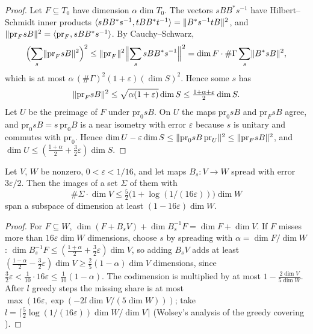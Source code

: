 \begin{proof}
Let $F\subseteq T_0$ have dimension $\alpha\dim T_0$. The vectors $sBB^*s^{-1}$ have Hilbert--Schmidt inner products $\langle sBB^*s^{-1},tBB^*t^{-1}\rangle=\lVert B^*s^{-1}tB\rVert^2$,
and $\lVert \mathrm{pr}_FsB\rVert^2=\langle\mathrm{pr}_F,sBB^*s^{-1}\rangle$. By Cauchy--Schwarz,
\[
  \Bigl(\sum_s\lVert \mathrm{pr}_FsB\rVert^2\Bigr)^2\le\lVert \mathrm{pr}_F\rVert^2\Bigl\|\sum_ssBB^*s^{-1}\Bigr\|^2=\dim F\cdot\#\Gamma\sum_s\lVert B^*sB\rVert^2,
\]
which is at most $\alpha\,(\#\Gamma)^2(1+\varepsilon)(\dim S)^2$. Hence some $s$ has
\[
  \lVert \mathrm{pr}_FsB\rVert^2\le\sqrt{\alpha(1+\varepsilon)}\dim S\le\tfrac{1+\alpha+\varepsilon}2\dim S.
\]
Let $U$ be the preimage of $F$ under $\mathrm{pr}_0sB$. On $U$ the maps
$\mathrm{pr}_0sB$ and $\mathrm{pr}_FsB$ agree, and $\mathrm{pr}_0sB=s\,\mathrm{pr}_0B$ is a near isometry with error $\varepsilon$ because $s$ is unitary and commutes with $\mathrm{pr}_0$. Hence
$\dim U-\varepsilon\dim S\le\lVert \mathrm{pr}_0sB\,\mathrm{pr}_U\rVert^2\le\lVert \mathrm{pr}_FsB\rVert^2$, and $\dim U\le(\frac{1+\alpha}2+\frac32\varepsilon)\dim S$.
\end{proof}

\begin{theorem}\label{thm:few-translates}
Let $V$, $W$ be nonzero, $0<\varepsilon<1/16$, and let maps $B_s\colon V\to W$ spread with error $3\varepsilon/2$. Then the images of a set $\Sigma$ of them with
\[
  \#\Sigma\cdot\dim V\le\tfrac52\bigl(1+\log(1/(16\varepsilon))\bigr)\dim W
\]
span a subspace of dimension at least $(1-16\varepsilon)\dim W$.
\end{theorem}

\begin{proof}
For $F\subseteq W$, $\dim(F+B_sV)+\dim B_s^{-1}F=\dim F+\dim V$. If $F$ misses more than $16\varepsilon\dim W$ dimensions, choose $s$ by spreading with $\alpha=\dim F/\dim W$:
$\dim B_s^{-1}F\le(\frac{1+\alpha}2+\frac32\varepsilon)\dim V$, so adding $B_sV$ adds at least $(\frac{1-\alpha}2-\frac32\varepsilon)\dim V\ge\frac25(1-\alpha)\dim V$ dimensions, since
$\frac32\varepsilon<\frac1{10}\cdot16\varepsilon\le\frac1{10}(1-\alpha)$. The codimension is multiplied by at most $1-\frac{2\dim V}{5\dim W}$. After $l$ greedy steps the missing share
is at most $\max(16\varepsilon,\exp(-2l\dim V/(5\dim W)))$; take $l=\lceil\frac52\log(1/(16\varepsilon))\dim W/\dim V\rceil$ (Wolsey's analysis of the greedy covering
\cite{Wolsey1982}).
\end{proof}

